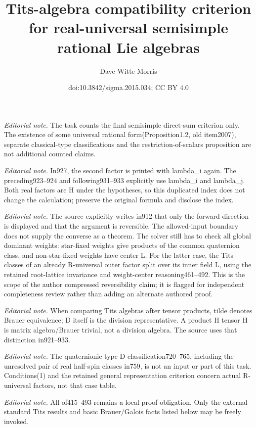\documentclass[10pt,a4paper]{amsart}
\title{Tits-algebra compatibility criterion for real-universal semisimple rational Lie algebras}
\author{Dave Witte Morris}
\date{doi:10.3842/sigma.2015.034; CC BY 4.0}
\numberwithin{equation}{section}
\begin{document}
\maketitle
\noindent\textit{Editorial note.} The task counts the final semisimple direct-sum criterion only. The existence of some universal rational form(Proposition1.2, old item2007), separate classical-type classifications and the restriction-of-scalars proposition are not additional counted claims.\par\medskip
\noindent\textit{Editorial note.} In927, the second factor is printed with lambda\_i again. The preceding923–924 and following931–933 explicitly use lambda\_i and lambda\_j. Both real factors are H under the hypotheses, so this duplicated index does not change the calculation; preserve the original formula and disclose the index.\par\medskip
\noindent\textit{Editorial note.} The source explicitly writes in912 that only the forward direction is displayed and that the argument is reversible. The allowed-input boundary does not supply the converse as a theorem. The solver still has to check all global dominant weights: star-fixed weights give products of the common quaternion class, and non-star-fixed weights have center L. For the latter case, the Tits classes of an already R-universal outer factor split over its inner field L, using the retained root-lattice invariance and weight-center reasoning461–492. This is the scope of the author compressed reversibility claim; it is flagged for independent completeness review rather than adding an alternate authored proof.\par\medskip
\noindent\textit{Editorial note.} When comparing Tits algebras after tensor products, tilde denotes Brauer equivalence; D itself is the division representative. A product H tensor H is matrix algebra/Brauer trivial, not a division algebra. The source uses that distinction in921–933.\par\medskip
\noindent\textit{Editorial note.} The quaternionic type-D classification720–765, including the unresolved pair of real half-spin classes in759, is not an input or part of this task. Conditions(1) and the retained general representation criterion concern actual R-universal factors, not that case table.\par\medskip
\noindent\textit{Editorial note.} All of415–493 remains a local proof obligation. Only the external standard Tits results and basic Brauer/Galois facts listed below may be freely invoked.\par\medskip
\end{document}
